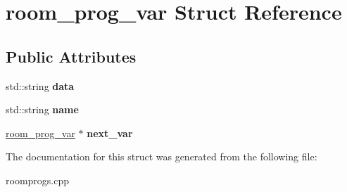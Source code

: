 \hypertarget{structroom__prog__var}{\section{room\-\_\-prog\-\_\-var Struct Reference}
\label{structroom__prog__var}
}
\subsection*{Public Attributes}
\begin{DoxyCompactItemize}
\item 
\hypertarget{structroom__prog__var_a608f7428fe55505c06a56496f6a1750b}{std\-::string {\bfseries data}}\label{structroom__prog__var_a608f7428fe55505c06a56496f6a1750b}

\item 
\hypertarget{structroom__prog__var_ae7d312fa45f62260d6b51ae2254df7c9}{std\-::string {\bfseries name}}\label{structroom__prog__var_ae7d312fa45f62260d6b51ae2254df7c9}

\item 
\hypertarget{structroom__prog__var_a6f0fecf23cadd63acf23d280a7d692ee}{\hyperlink{structroom__prog__var}{room\-\_\-prog\-\_\-var} $\ast$ {\bfseries next\-\_\-var}}\label{structroom__prog__var_a6f0fecf23cadd63acf23d280a7d692ee}

\end{DoxyCompactItemize}


The documentation for this struct was generated from the following file\-:\begin{DoxyCompactItemize}
\item 
roomprogs.\-cpp\end{DoxyCompactItemize}
